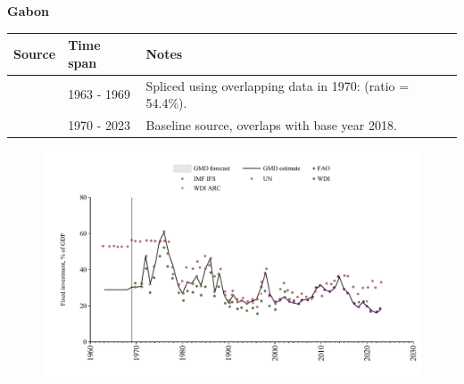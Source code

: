 \documentclass[12pt,a4paper,landscape]{article}
\begin{document}
\begin{adjustbox}{max totalsize={\paperwidth}{\paperheight},center}
\begin{minipage}[t][\textheight][t]{\textwidth}
\vspace*{0.5cm}
{}
\begin{center}
{\Large\bfseries Gabon}
\end{center}
\vspace{0.5cm}
\begin{table}[H]
\centering
\small
\begin{tabular}{|l|l|l|}
\hline
\textbf{Source} & \textbf{Time span} & \textbf{Notes} \\
\hline
\rowcolor{white}\cite{IMF_IFS}& 1963 - 1969 &Spliced using overlapping data in 1970: (ratio = 54.4\%).\\
\rowcolor{lightgray}\cite{WDI}& 1970 - 2023 &Baseline source, overlaps with base year 2018.\\
\hline
\end{tabular}
\end{table}
\begin{figure}[H]
\centering
\includegraphics[width=\textwidth,height=0.6\textheight,keepaspectratio]{graphs/GAB_finv_GDP.pdf}
\end{figure}
\end{minipage}
\end{adjustbox}
\end{document}
